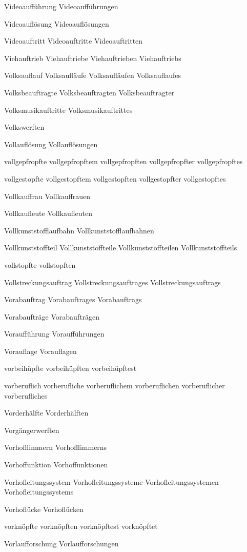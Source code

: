 Videoaufführung
Videoaufführungen

Videoauflösung
Videoauflösungen

Videoauftritt
Videoauftritte
Videoauftritten

Viehauftrieb
Viehauftriebe
Viehauftrieben
Viehauftriebs

Volksauflauf
Volksaufläufe
Volksaufläufen
Volksauflaufes

Volksbeauftragte
Volksbeauftragten
Volksbeauftragter

Volksmusikauftritte
Volksmusikauftrittes

Volkswerften

Vollauflösung
Vollauflösungen

vollgepfropfte
vollgepfropftem
vollgepfropften
vollgepfropfter
vollgepfropftes

vollgestopfte
vollgestopftem
vollgestopften
vollgestopfter
vollgestopftes

Vollkauffrau
Vollkauffrauen

Vollkaufleute
Vollkaufleuten

Vollkunststofflaufbahn
Vollkunststofflaufbahnen

Vollkunststoffteil
Vollkunststoffteile
Vollkunststoffteilen
Vollkunststoffteils

vollstopfte
vollstopften

Vollstreckungsauftrag
Vollstreckungsauftrages
Vollstreckungsauftrags

Vorabauftrag
Vorabauftrages
Vorabauftrags

Vorabaufträge
Vorabaufträgen

Voraufführung
Voraufführungen

Vorauflage
Vorauflagen

vorbeihüpfte
vorbeihüpften
vorbeihüpftest

vorberuflich
vorberufliche
vorberuflichem
vorberuflichen
vorberuflicher
vorberufliches

Vorderhälfte
Vorderhälften

Vorgängerwerften

Vorhofflimmern
Vorhofflimmerns

Vorhoffunktion
Vorhoffunktionen

Vorhofleitungssystem
Vorhofleitungssysteme
Vorhofleitungssystemen
Vorhofleitungssystems

Vorhoflücke
Vorhoflücken

vorknöpfte
vorknöpften
vorknöpftest
vorknöpftet

Vorlaufforschung
Vorlaufforschungen

